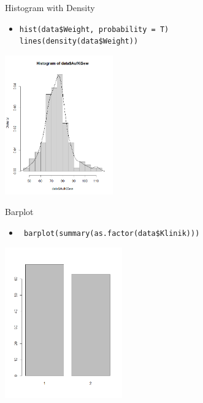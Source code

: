 \documentclass[xcolor=dvipsnames, aspectratio = 169]{beamer}
\begin{document}
\begin{frame}[fragile]{Histogram with Density}
	\begin{itemize}
		\item \verb+hist(data$Weight, probability = T) + \\ \verb+lines(density(data$Weight))+
	\end{itemize}
			
	\begin{center}
		\includegraphics[height=6cm]{Density}
	\end{center}
\end{frame}

\begin{frame}[fragile]{Barplot}
	\begin{itemize}
		\item \verb+ barplot(summary(as.factor(data$Klinik)))+
	\end{itemize}
			
	\begin{center}
		\includegraphics[height=6.5cm]{Barplot}
	\end{center}
\end{frame}
\end{document}
